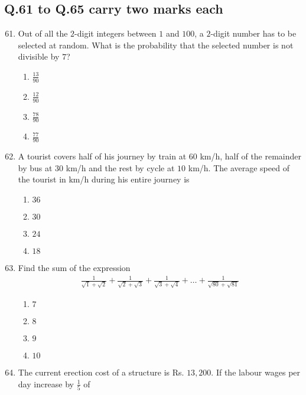 \documentclass[journal,12pt,onecolumn]{IEEEtran}
\theoremstyle{remark}
\begin{document}
\subsection{\textbf{Q.61 to Q.65 carry two marks each}}
\begin{enumerate}\setcounter{enumi}{60}
    \item Out of all the $2$-digit integers between $1$ and $100$, a $2$-digit number has to be selected at random. What is the probability that the selected number is not divisible by $7$?
    \begin{multicols}{4}
        \begin{enumerate}
            \item $\frac{13}{90}$
            \item $\frac{12}{90}$
            \item $\frac{78}{90}$
            \item $\frac{77}{90}$
        \end{enumerate}
    \end{multicols}
    \item A tourist covers half of his journey by train at $60$ km/h, half of the remainder by bus at $30$ km/h and
the rest by cycle at $10$ km/h. The average speed of the tourist in km/h during his entire journey is
\begin{multicols}{4}
    \begin{enumerate}
        \item $36$
        \item $30$
        \item $24$
        \item $18$
    \end{enumerate}
\end{multicols}
\item Find the sum of the expression
\begin{align}
    \frac{1}{\sqrt{1}+\sqrt{2}}+\frac{1}{\sqrt{2}+\sqrt{3}}+\frac{1}{\sqrt{3}+\sqrt{4}}+\dots + \frac{1}{\sqrt{80}+\sqrt{81}}
\end{align}
    \begin{enumerate}
        \item $7$ \item $8$ \item $9$ \item $10$
    \end{enumerate}
\item The current erection cost of a structure is Rs. $13,200$. If the labour wages per day increase by $\frac{1}{5}$ of

\end{enumerate}
\end{document}
